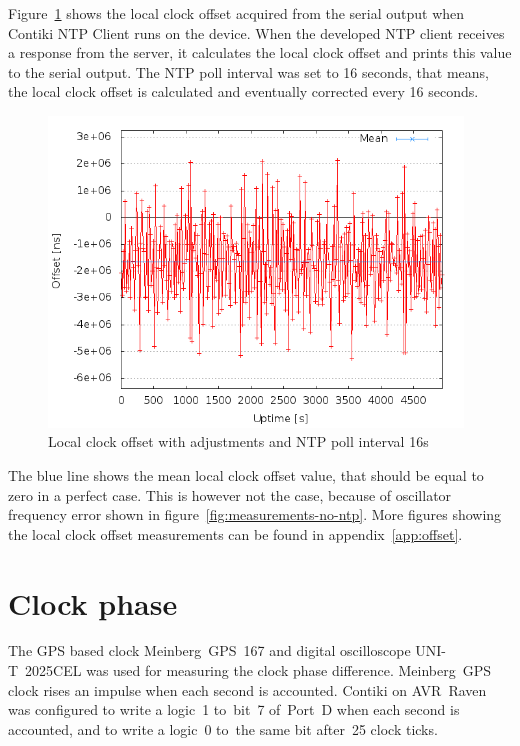 Figure~\ref{fig:measurements-ntp-serial} shows the local clock offset
acquired from the serial output when Contiki NTP Client runs on the device.
When the developed NTP client receives a response from the server,
it calculates the local clock offset and prints this value to the serial output.
The NTP poll interval was set to 16 seconds, that means, the local clock offset
is calculated and eventually corrected every 16 seconds.
\begin{figure}[H]
  \centering
  \includegraphics[width=11cm,keepaspectratio]{fig/poll-16s.png}
  \caption{Local clock offset with adjustments and NTP poll interval 16s}
  \label{fig:measurements-ntp-serial}
\end{figure}
The blue line shows the mean local clock offset value,
that should be equal to zero in a perfect case.
This is however not the case, because of oscillator frequency error
shown in figure~\ref{fig:measurements-no-ntp}.
More figures showing the local clock offset measurements
can be found in appendix~\ref{app:offset}.

\section{Clock phase}
The GPS based clock Meinberg~GPS~167 and digital oscilloscope UNI-T~2025CEL
was used for measuring the clock phase difference.
Meinberg~GPS clock rises an impulse when each second is accounted.
Contiki on AVR~Raven was configured to write a logic~1
to~bit~7 of~Port~D when each second is accounted,
and to write a logic~0 to~the same bit after~25 clock ticks.

